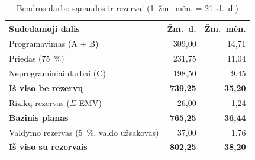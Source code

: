 \begin{table}[H]
  \centering
  \caption{Bendros darbo sąnaudos ir rezervai (1~žm.~mėn. = 21~d.~d.)}
  \label{tab:sanaudos}
  \small
  \begin{tabular}{@{}lrr@{}}
    \toprule
    \textbf{Sudedamoji dalis} & \textbf{Žm.~d.} & \textbf{Žm.~mėn.} \\
    \midrule
    Programavimas (A + B) & 309,00 & 14,71 \\
    Priedas (75~\%) & 231,75 & 11,04 \\
    Neprograminiai darbai (C) & 198,50 & 9,45 \\
    \midrule
    \textbf{Iš viso be rezervų} & \textbf{739,25} & \textbf{35,20} \\
    Rizikų rezervas ($\Sigma$ EMV) & 26,00 & 1,24 \\
    \textbf{Bazinis planas} & \textbf{765,25} & \textbf{36,44} \\
    Valdymo rezervas (5~\%, valdo užsakovas) & 37,00 & 1,76 \\
    \midrule
    \textbf{Iš viso su rezervais} & \textbf{802,25} & \textbf{38,20} \\
    \bottomrule
  \end{tabular}
\end{table}

